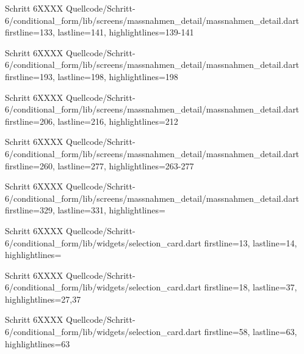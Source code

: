 


  \begin{alexlistingzwei}{Schritt 6}{XXXX}
    {Quellcode/Schritt-6/conditional_form/lib/screens/massnahmen_detail/massnahmen_detail.dart}
    {firstline=133, lastline=141, highlightlines={139-141}}
    \label{lst:Schritt6XXXXX}
  \end{alexlistingzwei}

  \begin{alexlistingzwei}{Schritt 6}{XXXX}
    {Quellcode/Schritt-6/conditional_form/lib/screens/massnahmen_detail/massnahmen_detail.dart}
    {firstline=193, lastline=198, highlightlines={198}}
    \label{lst:Schritt6XXXXX}
  \end{alexlistingzwei}

  \begin{alexlistingzwei}{Schritt 6}{XXXX}
    {Quellcode/Schritt-6/conditional_form/lib/screens/massnahmen_detail/massnahmen_detail.dart}
    {firstline=206, lastline=216, highlightlines={212}}
    \label{lst:Schritt6XXXXX}
  \end{alexlistingzwei}

  \begin{alexlistingzwei}{Schritt 6}{XXXX}
    {Quellcode/Schritt-6/conditional_form/lib/screens/massnahmen_detail/massnahmen_detail.dart}
    {firstline=260, lastline=277, highlightlines={263-277}}
    \label{lst:Schritt6XXXXX}
  \end{alexlistingzwei}

  \begin{alexlistingzwei}{Schritt 6}{XXXX}
    {Quellcode/Schritt-6/conditional_form/lib/screens/massnahmen_detail/massnahmen_detail.dart}
    {firstline=329, lastline=331, highlightlines={}}
    \label{lst:Schritt6XXXXX}
  \end{alexlistingzwei}


  \begin{alexlistingzwei}{Schritt 6}{XXXX}
    {Quellcode/Schritt-6/conditional_form/lib/widgets/selection_card.dart}
    {firstline=13, lastline=14, highlightlines={}}
    \label{lst:Schritt6XXXX}
\end{alexlistingzwei}

\begin{alexlistingzwei}{Schritt 6}{XXXX}
    {Quellcode/Schritt-6/conditional_form/lib/widgets/selection_card.dart}
    {firstline=18, lastline=37, highlightlines={27,37}}
    \label{lst:Schritt6XXXX}
\end{alexlistingzwei}

\begin{alexlistingzwei}{Schritt 6}{XXXX}
    {Quellcode/Schritt-6/conditional_form/lib/widgets/selection_card.dart}
    {firstline=58, lastline=63, highlightlines={63}}
    \label{lst:Schritt6XXXX}
\end{alexlistingzwei}

